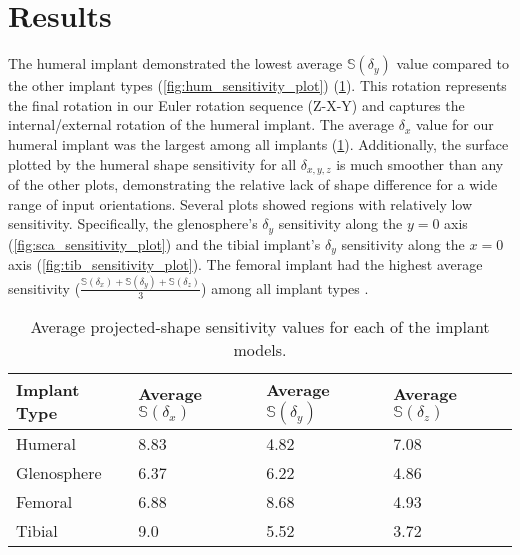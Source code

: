 \section{Results}
The humeral implant demonstrated the lowest average $\mathbb{S}(\delta_{y})$ value compared to the other implant types (\cref{fig:hum_sensitivity_plot}) (\cref{tab:ss-vals}).
This rotation represents the final rotation in our Euler rotation sequence (Z-X-Y) and captures the internal/external rotation of the humeral implant.
The average $\delta_{x}$ value for our humeral implant was the largest among all implants (\cref{tab:ss-vals}).
Additionally, the surface plotted by the humeral shape sensitivity for all $\delta_{x,y,z}$ is much smoother than any of the other plots, demonstrating the relative lack of shape difference for a wide range of input orientations.
Several plots showed regions with relatively low sensitivity.
Specifically, the glenosphere's $\delta_{y}$ sensitivity along the $y=0$ axis (\cref{fig:sca_sensitivity_plot}) and the tibial implant's $\delta_{y}$ sensitivity along the $x=0$ axis (\cref{fig:tib_sensitivity_plot}).
The femoral implant had the highest average sensitivity ($\frac{\mathbb{S}(\delta_{x}) +\mathbb{S}(\delta_{y}) +\mathbb{S}(\delta_{z})  }{3}$) among all implant types .


\begin{table}
	\caption{Average projected-shape sensitivity values for each of the implant models.} \label{tab:ss-vals}
	\begin{tabularx}{\textwidth}{|X|X|X|X|}\hline
		{\bf Implant Type} & Average $\mathbb{S}(\delta_{x})$ & Average  $\mathbb{S}(\delta_{y})$ & Average $\mathbb{S}(\delta_{z})$ \\ \hline
		Humeral            & 8.83                             & 4.82                              & 7.08                             \\\hline
		Glenosphere        & 6.37                             & 6.22                              & 4.86                             \\\hline
		Femoral            & 6.88                             & 8.68                              & 4.93                             \\\hline
		Tibial             & 9.0                              & 5.52                              & 3.72                             \\\hline
	\end{tabularx}
\end{table}


